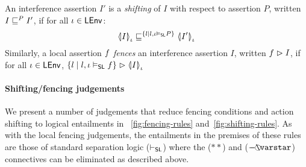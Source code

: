%
%
%
\begin{definition}
An interference assertion $I'$ is a \emph{shifting} of $I$ with respect to assertion $P$, written $I \weakenI{P} I'$, if for all $\lenv \in \LEnv$:
%
\[
	\semI[\lenv]{I} \weakenI{\left\{l \mid l, \lenv \slsat P \right\}} \semI[\lenv]{I'}
\]
%
Similarly, a local assertion $\lass{f}$ \emph{fences} an interference assertion $I$, written $\lass{f} \fences I$, if for all $\lenv \in \LEnv$,
%
\qquad
$
	\left\{l \mid l, \lenv \slsat \lass{F} \right\} \fences \semI[\lenv]{I}
$
%
\end{definition}
%
\paragraph{\textbf{Shifting/fencing judgements}}We present a number of judgements that reduce fencing conditions and action shifting to logical entailments in \fig~\ref{fig:fencing-rules} and~\ref{fig:shifting-rules}. As with the local fencing judgements, the entailments in the premises of these rules are those of standard separation logic ($\slentails$) where the ($**$) and ($\septraction$) connectives can be eliminated as described above. 


